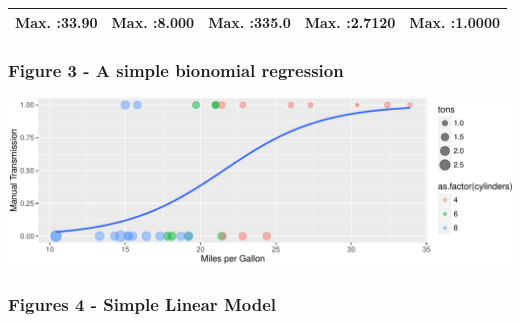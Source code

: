 \documentclass[]{article}
\begin{document}
\begin{longtable}[c]{@{}ccccc@{}}
\begin{minipage}[t]{0.17\columnwidth}\centering\strut
Max. :33.90
\strut\end{minipage} &
\begin{minipage}[t]{0.17\columnwidth}\centering\strut
Max. :8.000
\strut\end{minipage} &
\begin{minipage}[t]{0.17\columnwidth}\centering\strut
Max. :335.0
\strut\end{minipage} &
\begin{minipage}[t]{0.18\columnwidth}\centering\strut
Max. :2.7120
\strut\end{minipage} &
\begin{minipage}[t]{0.18\columnwidth}\centering\strut
Max. :1.0000
\strut\end{minipage}\tabularnewline
\bottomrule
\end{longtable}

\subsubsection{Figure 3 - A simple bionomial
regression}\label{figure-3---a-simple-bionomial-regression}

\includegraphics{study_files/figure-latex/simple binomial fit-1.pdf}
\newpage

\subsubsection{Figures 4 - Simple Linear
Model}\label{figures-4---simple-linear-model}
\end{document}
